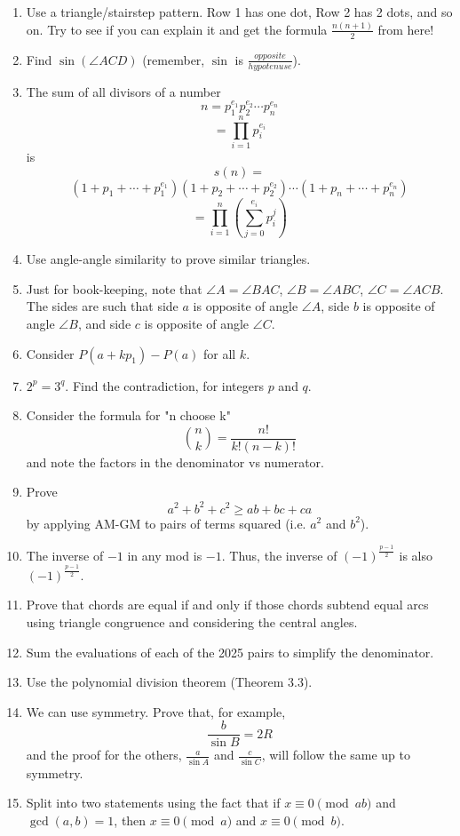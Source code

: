 \begin{enumerate}[label=\textbf{H\arabic*.}]
    \item Use a triangle/stairstep pattern. Row 1 has one dot, Row 2 has 2 dots, and so on. Try to see if you can explain it and get the formula $\frac{n(n+1)}{2}$ from here!
    \item Find $\sin(\angle ACD)$ (remember, $\sin$ is $\frac{opposite}{hypotenuse}$).
    \item The sum of all divisors of a number
    \[ 
    n = p_1^{e_1}p_2^{e_2} \cdots p_n^{e_n}
    \]
    \[
    = \prod_{i=1}^{n}{p_i^{e_i}}
    \]
    is
    \[
    s(n) = 
    \]
    \[
    (1 + p_1 + \cdots + p_1^{e_1})(1 + p_2 + \cdots + p_2^{e_2})\cdots(1 + p_n + \cdots + p_n^{e_n})
    \]
    \[
    = \prod_{i=1}^{n}{\left( \sum_{j = 0}^{e_i}{p_i^{j}} \right)}
    \]
    \item Use angle-angle similarity to prove similar triangles. 
    \item Just for book-keeping, note that $\angle A = \angle BAC$, $\angle B = \angle ABC$, $\angle C = \angle ACB$. The sides are such that side $a$ is opposite of angle $\angle A$, side $b$ is opposite of angle $\angle B$, and side $c$ is opposite of angle $\angle C$.
    \item Consider $P(a + kp_1) - P(a)$ for all $k$.
    \item $2^p = 3^q$. Find the contradiction, for integers $p$ and $q$. 
    \item Consider the formula for "n choose k"
    \[
    \binom{n}{k} = \frac{n!}{k!(n-k)!}
    \]
    and note the factors in the denominator vs numerator.
    \item Prove
    \[
    a^2 + b^2 + c^2 \geq ab + bc + ca
    \]
    by applying AM-GM to pairs of terms squared (i.e. $a^2$ and $b^2$). 
    \item The inverse of $-1$ in any mod is $-1$. Thus, the inverse of $(-1)^{\frac{p-1}{2}}$ is also $(-1)^{\frac{p-1}{2}}$. 
    \item Prove that chords are equal if and only if those chords subtend equal arcs using triangle congruence and considering the central angles.
    \item Sum the evaluations of each of the 2025 pairs to simplify the denominator.
    \item Use the polynomial division theorem (Theorem 3.3). 
    \item We can use symmetry. Prove that, for example, 
    \[
    \frac{b}{\sin B} = 2R
    \]
    and the proof for the others, $\frac{a}{\sin A}$ and $\frac{c}{\sin C}$, will follow the same up to symmetry.
    \item Split into two statements using the fact that if $x \equiv 0 \pmod{ab}$ and $\gcd(a, b) = 1$, then $x \equiv 0 \pmod{a}$ and $x \equiv 0 \pmod{b}$. 

\end{enumerate}

